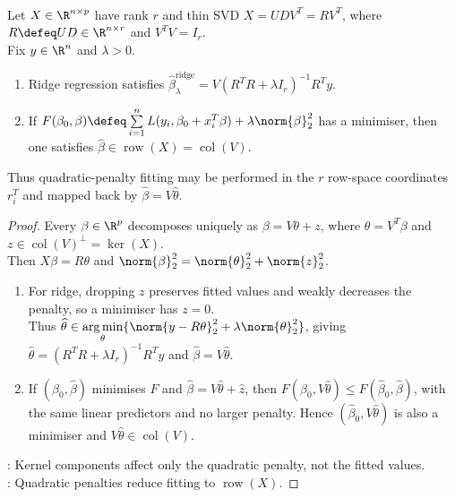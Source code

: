 \begin{proposition} \label{prop:sl-row-space-reduction-quadratic-penalties} \\
Let $X\in\R^{n\times p}$ have rank $r$ and thin SVD $X=UDV^T=RV^T$, where $R\defeq UD\in\R^{n\times r}$ and $V^TV=I_r$.\\
Fix $y\in\R^n$ and $\lambda>0$.
\begin{enumerate}[label=(\roman*)]
\setlength{\itemsep}{0pt}
\item Ridge regression satisfies $\widehat{\beta}^{\mathrm{ridge}}_\lambda=V(R^TR+\lambda I_r)^{-1}R^Ty$.
\item If $F(\beta_0,\beta)\defeq\sum\limits_{i=1}^n L(y_i,\beta_0+x_i^T\beta)+\lambda\norm{\beta}_2^2$ has a minimiser, then one satisfies $\widehat{\beta}\in\operatorname{row}(X)=\operatorname{col}(V)$.
\end{enumerate}
Thus quadratic-penalty fitting may be performed in the $r$ row-space coordinates $r_i^T$ and mapped back by $\widehat{\beta}=V\widehat{\theta}$.
\begin{proof} Every $\beta\in\R^p$ decomposes uniquely as $\beta=V\theta+z$, where $\theta=V^T\beta$ and $z\in\operatorname{col}(V)^\perp=\ker(X)$.\\
Then $X\beta=R\theta$ and $\norm{\beta}_2^2=\norm{\theta}_2^2+\norm{z}_2^2$.
\begin{enumerate}[label=(\roman*)]
\setlength{\itemsep}{0pt}
\item For ridge, dropping $z$ preserves fitted values and weakly decreases the penalty, so a minimiser has $z=0$.\\
Thus $\widehat{\theta}\in\operatorname*{arg\,min}\limits_{\theta}\{\norm{y-R\theta}_2^2+\lambda\norm{\theta}_2^2\}$, giving $\widehat{\theta}=(R^TR+\lambda I_r)^{-1}R^Ty$ and $\widehat{\beta}=V\widehat{\theta}$.
\item If $(\widehat{\beta}_0,\widehat{\beta})$ minimises $F$ and $\widehat{\beta}=V\widehat{\theta}+\widehat{z}$, then $F(\widehat{\beta}_0,V\widehat{\theta})\leq F(\widehat{\beta}_0,\widehat{\beta})$, with the same linear predictors and no larger penalty. Hence $(\widehat{\beta}_0,V\widehat{\theta})$ is also a minimiser and $V\widehat{\theta}\in\operatorname{col}(V)$.
\end{enumerate}
: Kernel components affect only the quadratic penalty, not the fitted values.\\
: Quadratic penalties reduce fitting to $\operatorname{row}(X)$.
\end{proof}
\end{proposition}

